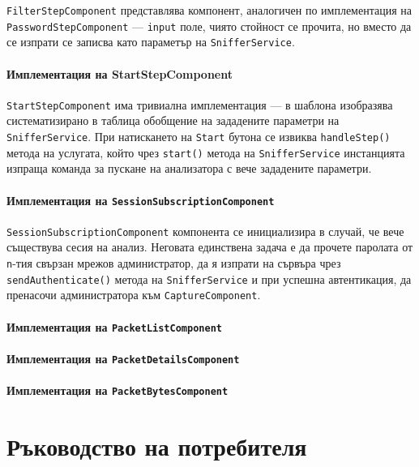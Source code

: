 \documentclass[12pt,a4paper,oneside]{book}
\begin{document}
\texttt{FilterStepComponent} представлява компонент, аналогичен по имплементация на
\texttt{PasswordStepComponent} --- \texttt{input} поле, чиято стойност се
прочита, но вместо да се изпрати се записва като параметър на \texttt{SnifferService}.

\subsubsection{Имплементация на StartStepComponent}

\texttt{StartStepComponent} има тривиална имплементация ---
в шаблона изобразява
систематизирано в таблица обобщение на зададените параметри на
\texttt{SnifferService}. При натискането на \texttt{Start} бутона се извиква
\texttt{handleStep()} метода на услугата, който чрез \texttt{start()}
метода на \texttt{SnifferService} инстанцията изпраща команда за пускане
на анализатора с вече зададените параметри.

\subsubsection{Имплементация на \texttt{SessionSubscriptionComponent}}

\texttt{SessionSubscriptionComponent} компонента се инициализира в случай, че
вече съществува сесия на анализ. Неговата единствена задача е да прочете
паролата от \texttt{n}-тия свързан мрежов администратор, да я изпрати на сървъра
чрез \texttt{sendAuthenticate()} метода на \texttt{SnifferService} и при успешна
автентикация, да пренасочи администратора към \texttt{CaptureComponent}.

\subsubsection{Имплементация на \texttt{PacketListComponent}}

\subsubsection{Имплементация на \texttt{PacketDetailsComponent}}
\subsubsection{Имплементация на \texttt{PacketBytesComponent}}

\chapter{Ръководство на потребителя}
\end{document}
